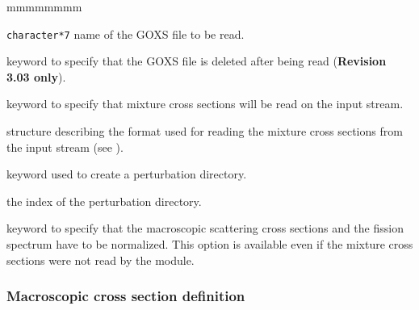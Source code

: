 \begin{ListeDeDescription}{mmmmmmmm}
\item[\dusa{GOXSRN}] {\tt character*7} name of the GOXS file to be read.

\item[\moc{DELE}] keyword to specify that the GOXS file is deleted after being read
({\bf Revision 3.03 only}).

\item[\moc{INPUT}] keyword to specify that mixture cross sections will be
read on the input stream.

\item[\dstr{descxs}] structure describing the format used for reading the
mixture cross sections from the input stream (see
).

\item[\moc{STEP}] keyword used to create a perturbation directory.

\item[\dusa{istep}] the index of the perturbation directory.

\item[\moc{NORM}] keyword to specify that the macroscopic scattering cross
sections and the fission spectrum have to be normalized. This option is
available even if the mixture cross sections were not read by the 
module.

\end{ListeDeDescription}

\goodbreak

\subsubsection{Macroscopic cross section definition}\label{sect:descxs}

